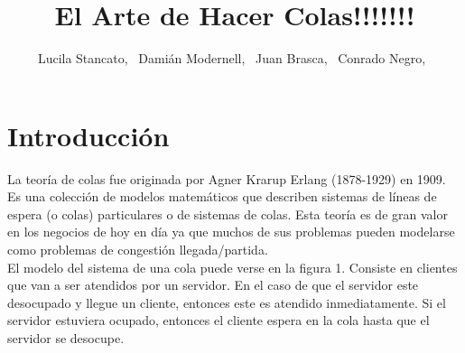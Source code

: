 \documentclass[10pt,journal,compsoc]{IEEEtran}
\begin{document}
\title{El Arte de Hacer Colas!!!!!!!}


\author{Lucila Stancato,~
		Dami\'an Modernell,~
		Juan Brasca,~
		Conrado Negro,~%
}


\maketitle

\IEEEdisplaynotcompsoctitleabstractindextext

\IEEEpeerreviewmaketitle

\section{Introducci\'on} %
La teor\'ia de colas fue originada por Agner Krarup Erlang (1878-1929) en 1909. Es una colecci\'on
de modelos matem\'aticos que describen sistemas de l\'ineas de espera (o colas) particulares o de
sistemas de colas. Esta teor\'ia es de gran valor en los negocios de hoy en d\'ia ya que muchos de
sus problemas pueden modelarse como problemas de congesti\'on llegada/partida.\\
El modelo del sistema de una cola puede verse en la figura 1. Consiste en clientes que van a ser
atendidos por un servidor. En el caso de que el servidor este desocupado y llegue un cliente, entonces
este es atendido inmediatamente. Si el servidor estuviera ocupado, entonces el cliente espera en la
cola hasta que el servidor se desocupe.\\
\end{document}
